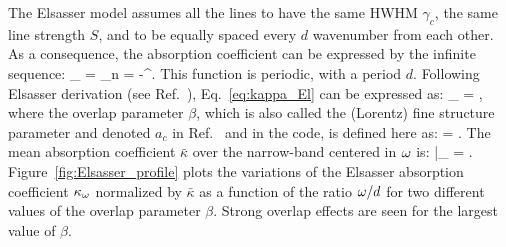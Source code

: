 The Elsasser model assumes all the lines to have the same HWHM $\gamma_c$, the same line strength $S$, and to be equally spaced every $d$ wavenumber from each other.
As a consequence, the absorption coefficient can be expressed by the infinite sequence:
\be\label{eq:kappa_El}
\kappa_{\om} = \displaystyle\sum_{n = -\infty}^{\infty}{}.
\ee
This function is periodic, with a period $d$. Following Elsasser derivation (see Ref.~\cite{Penner1959}), Eq.~\ref{eq:kappa_El} can be expressed as:
\be\label{eq:Elsasser_periodic}
\kappa_{\om}  =  ,
\ee
where the overlap parameter $\beta$, which is also called the (Lorentz) fine structure parameter and denoted $a_c$ in Ref.~\cite{Ludwig1973} and in the code, is defined here as:
\be\label{eq::beta}
\beta = .
\ee
The mean absorption coefficient $\bar{\kappa}$ over the narrow-band centered in $\omega$ is:
\be\label{eq:kappa_def}
\bar{\kappa}_{\om} = .
\ee
Figure~\ref{fig:Elsasser_profile} plots the variations of the Elsasser absorption coefficient $\kappa_{\omega}$ normalized by $\bar{\kappa}$ as a function of the ratio $\omega/d$ for two different values of the overlap parameter $\beta$. Strong overlap effects are seen for the largest value of $\beta$.

